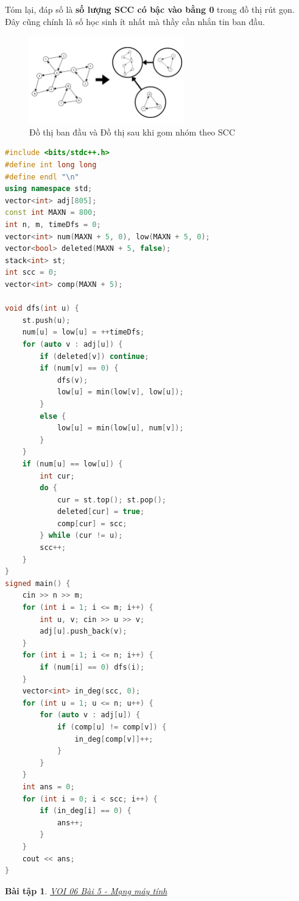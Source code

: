 \documentclass{article}
\newtheorem{baitap}{Bài tập}
\begin{document}
Tóm lại, đáp số là \textbf{số lượng SCC có bậc vào bằng 0} trong đồ thị rút gọn. Đây cũng chính là số học sinh ít nhất mà thầy cần nhắn tin ban đầu.

\begin{figure}[h]
    \centering
    \includegraphics[width=0.6\textwidth]{img/b5/message.png}
    \caption{Đồ thị ban đầu và Đồ thị sau khi gom nhóm theo SCC}
\end{figure}

\begin{lstlisting}[language=C++, caption={Cài đặt}]
#include <bits/stdc++.h>
#define int long long
#define endl "\n"
using namespace std;
vector<int> adj[805];
const int MAXN = 800;
int n, m, timeDfs = 0;
vector<int> num(MAXN + 5, 0), low(MAXN + 5, 0);
vector<bool> deleted(MAXN + 5, false);
stack<int> st;
int scc = 0;
vector<int> comp(MAXN + 5);

void dfs(int u) {
    st.push(u);
    num[u] = low[u] = ++timeDfs;
    for (auto v : adj[u]) {
        if (deleted[v]) continue;
        if (num[v] == 0) {
            dfs(v);
            low[u] = min(low[v], low[u]);
        }
        else {
            low[u] = min(low[u], num[v]);
        }
    }    
    if (num[u] == low[u]) {
        int cur;
        do {
            cur = st.top(); st.pop();
            deleted[cur] = true;
            comp[cur] = scc;
        } while (cur != u);
        scc++;
    }
}
signed main() {
    cin >> n >> m;
    for (int i = 1; i <= m; i++) {
        int u, v; cin >> u >> v;
        adj[u].push_back(v);
    }
    for (int i = 1; i <= n; i++) {
        if (num[i] == 0) dfs(i);
    }
    vector<int> in_deg(scc, 0);
    for (int u = 1; u <= n; u++) {
        for (auto v : adj[u]) {
            if (comp[u] != comp[v]) {
                in_deg[comp[v]]++;
            }
        }
    }
    int ans = 0;
    for (int i = 0; i < scc; i++) {
        if (in_deg[i] == 0) {
            ans++;
        }
    }
    cout << ans;
}
\end{lstlisting}

\begin{baitap}
    \href{https://oj.vnoi.info/problem/nkonearc}{VOI 06 Bài 5 - Mạng máy tính}
\end{baitap}
\end{document}
